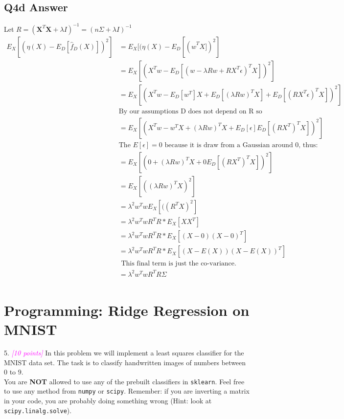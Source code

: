 \documentclass{article}
\newcommand{\1}{\mathbf{1}}
\newcommand{\mat}[1]{\boldsymbol{#1}} %
\newcommand{\grade}[1]{\small\textcolor{magenta}{\emph{[#1 points]}} \normalsize}
\begin{document}
\subsection{Q4d Answer}
Let $R=(\mat{X}^T\mat{X} + \lambda I)^{-1} =(n\Sigma + \lambda I)^{-1} $
\begin{align}
     E_X[(\eta(X) - E_D[\hat{f}_D(X)])^2] & = E_X[(\eta(X) - E_D[(\hat{w}^TX])^2] \\
    & = E_X[(X^T w -E_D[(w - \lambda R w + R X^T \epsilon)^T X])^2] \\
    &= E_X[(X^T w - E_D[w^T]X +E_D[(\lambda R w)^T X] + E_D[(RX^T\epsilon)^TX])^2] \\
    & \text{By our assumptions D does not depend on R so} \\
    &= E_X[(X^T w - w^TX + (\lambda R w)^T X + E_D[\epsilon]E_D[(RX^T)^TX])^2] \\
    & \text{The $E[\epsilon] = 0 $ because it is draw from a Gaussian around 0, thus:} \\
    &= E_X[(0 + (\lambda R w)^T X + 0  E_D[(RX^T)^TX])^2] \\
    &= E_X[ ((\lambda R w)^T X)^2] \\
    &=\lambda^2 w^Tw E_X[ ( (R^T X)^2] \\
    &=\lambda^2 w^Tw R^T R * E_X[XX^T] \\
    &=\lambda^2 w^Tw R^T R * E_X[(X-0)(X-0)^T] \\
    &=\lambda^2 w^Tw R^T R * E_X[(X-E(X))(X-E(X))^T] \\
    & \text{ This final term is just the co-variance. } \\
    &=\lambda^2 w^Tw R^T R \Sigma \\
\end{align}





\section{Programming: Ridge Regression on MNIST}
5. \grade{10} In this problem we will implement a least squares classifier for the MNIST data set. The task
is to classify handwritten images of numbers between $0$ to $9$.\\

You are \textbf{NOT} allowed to use
any of the prebuilt  classifiers in \verb|sklearn|.  Feel free to use any method from \verb|numpy|
or \verb|scipy|. Remember: if you are inverting a matrix in your code, you are probably doing something wrong (Hint: look at \verb|scipy.linalg.solve|).\\
\end{document}
